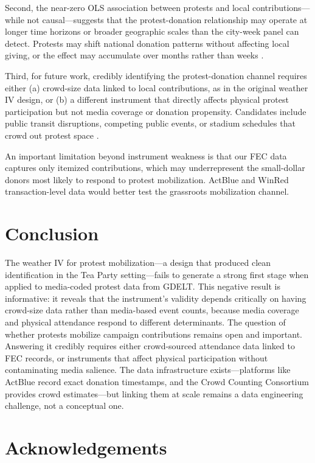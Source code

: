\documentclass[12pt]{article}
\begin{document}
Second, the near-zero OLS association between protests and local contributions---while not causal---suggests that the protest-donation relationship may operate at longer time horizons or broader geographic scales than the city-week panel can detect. Protests may shift national donation patterns without affecting local giving, or the effect may accumulate over months rather than weeks \citep{wasow2020, cantoni2019}.

Third, for future work, credibly identifying the protest-donation channel requires either (a) crowd-size data linked to local contributions, as in the original weather IV design, or (b) a different instrument that directly affects physical protest participation but not media coverage or donation propensity. Candidates include public transit disruptions, competing public events, or stadium schedules that crowd out protest space \citep{madestam2013}.

An important limitation beyond instrument weakness is that our FEC data captures only itemized contributions, which may underrepresent the small-dollar donors most likely to respond to protest mobilization. ActBlue and WinRed transaction-level data would better test the grassroots mobilization channel.


\section{Conclusion}

The weather IV for protest mobilization---a design that produced clean identification in the Tea Party setting---fails to generate a strong first stage when applied to media-coded protest data from GDELT. This negative result is informative: it reveals that the instrument's validity depends critically on having crowd-size data rather than media-based event counts, because media coverage and physical attendance respond to different determinants. The question of whether protests mobilize campaign contributions remains open and important. Answering it credibly requires either crowd-sourced attendance data linked to FEC records, or instruments that affect physical participation without contaminating media salience. The data infrastructure exists---platforms like ActBlue record exact donation timestamps, and the Crowd Counting Consortium provides crowd estimates---but linking them at scale remains a data engineering challenge, not a conceptual one.

\section*{Acknowledgements}
\end{document}
